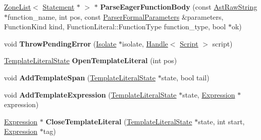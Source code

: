 \begin{DoxyCompactItemize}
\item 
\hyperlink{classv8_1_1internal_1_1_zone_list}{Zone\+List}$<$ \hyperlink{classv8_1_1internal_1_1_statement}{Statement} $\ast$ $>$ $\ast$ {\bfseries Parse\+Eager\+Function\+Body} (const \hyperlink{classv8_1_1internal_1_1_ast_raw_string}{Ast\+Raw\+String} $\ast$function\+\_\+name, int pos, const \hyperlink{structv8_1_1internal_1_1_parser_formal_parameters}{Parser\+Formal\+Parameters} \&parameters, Function\+Kind kind, Function\+Literal\+::\+Function\+Type function\+\_\+type, bool $\ast$ok)\hypertarget{classv8_1_1internal_1_1_parser_a908d9a49be35d1d14a2022810aa46519}{}\label{classv8_1_1internal_1_1_parser_a908d9a49be35d1d14a2022810aa46519}

\item 
void {\bfseries Throw\+Pending\+Error} (\hyperlink{classv8_1_1internal_1_1_isolate}{Isolate} $\ast$isolate, \hyperlink{classv8_1_1internal_1_1_handle}{Handle}$<$ \hyperlink{classv8_1_1internal_1_1_script}{Script} $>$ script)\hypertarget{classv8_1_1internal_1_1_parser_a8e95104399faf6e2cf520ae97743897c}{}\label{classv8_1_1internal_1_1_parser_a8e95104399faf6e2cf520ae97743897c}

\item 
\hyperlink{classv8_1_1internal_1_1_parser_traits_1_1_template_literal}{Template\+Literal\+State} {\bfseries Open\+Template\+Literal} (int pos)\hypertarget{classv8_1_1internal_1_1_parser_a041c84a4cb63262101b492fed4c76f9e}{}\label{classv8_1_1internal_1_1_parser_a041c84a4cb63262101b492fed4c76f9e}

\item 
void {\bfseries Add\+Template\+Span} (\hyperlink{classv8_1_1internal_1_1_parser_traits_1_1_template_literal}{Template\+Literal\+State} $\ast$state, bool tail)\hypertarget{classv8_1_1internal_1_1_parser_afe5304f7ed5ccf3721663abbc671f821}{}\label{classv8_1_1internal_1_1_parser_afe5304f7ed5ccf3721663abbc671f821}

\item 
void {\bfseries Add\+Template\+Expression} (\hyperlink{classv8_1_1internal_1_1_parser_traits_1_1_template_literal}{Template\+Literal\+State} $\ast$state, \hyperlink{classv8_1_1internal_1_1_expression}{Expression} $\ast$expression)\hypertarget{classv8_1_1internal_1_1_parser_adaca3a9c900f18e158a879df5149af5e}{}\label{classv8_1_1internal_1_1_parser_adaca3a9c900f18e158a879df5149af5e}

\item 
\hyperlink{classv8_1_1internal_1_1_expression}{Expression} $\ast$ {\bfseries Close\+Template\+Literal} (\hyperlink{classv8_1_1internal_1_1_parser_traits_1_1_template_literal}{Template\+Literal\+State} $\ast$state, int start, \hyperlink{classv8_1_1internal_1_1_expression}{Expression} $\ast$tag)\hypertarget{classv8_1_1internal_1_1_parser_a73a6c2915bff5f2a4b5c5d24ad83e2a6}{}\label{classv8_1_1internal_1_1_parser_a73a6c2915bff5f2a4b5c5d24ad83e2a6}


\end{DoxyCompactItemize}
